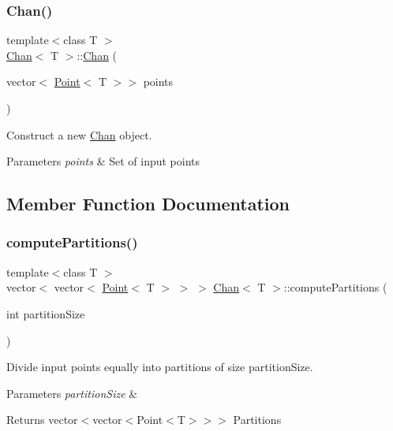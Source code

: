 \subsubsection{\texorpdfstring{Chan()}{Chan()}}
{\footnotesize\ttfamily template$<$class T $>$ \\
\mbox{\hyperlink{classChan}{Chan}}$<$ T $>$\+::\mbox{\hyperlink{classChan}{Chan}} (\begin{DoxyParamCaption}\item[{vector$<$ \mbox{\hyperlink{classPoint}{Point}}$<$ T $>$$>$}]{points }\end{DoxyParamCaption})}



Construct a new \mbox{\hyperlink{classChan}{Chan}} object. 


\begin{DoxyParams}{Parameters}
{\em points} & Set of input points \\
\hline
\end{DoxyParams}


\subsection{Member Function Documentation}
\mbox{\label{classChan_a6c42d1c1eab98ab7fb9a3a851f51f305}} 
\subsubsection{\texorpdfstring{compute\+Partitions()}{computePartitions()}}
{\footnotesize\ttfamily template$<$class T $>$ \\
vector$<$ vector$<$ \mbox{\hyperlink{classPoint}{Point}}$<$ T $>$ $>$ $>$ \mbox{\hyperlink{classChan}{Chan}}$<$ T $>$\+::compute\+Partitions (\begin{DoxyParamCaption}\item[{int}]{partition\+Size }\end{DoxyParamCaption})\hspace{0.3cm}{\ttfamily [private]}}



Divide input points equally into partitions of size \textquotesingle{}partition\+Size\textquotesingle{}. 


\begin{DoxyParams}{Parameters}
{\em partition\+Size} & \\
\hline
\end{DoxyParams}
\begin{DoxyReturn}{Returns}
vector$<$vector$<$Point$<$\+T$>$$>$$>$ Partitions 
\end{DoxyReturn}
\mbox{\label{classChan_a3cfcc1c908e1b4fde9bddb33d1af6d65}} 
